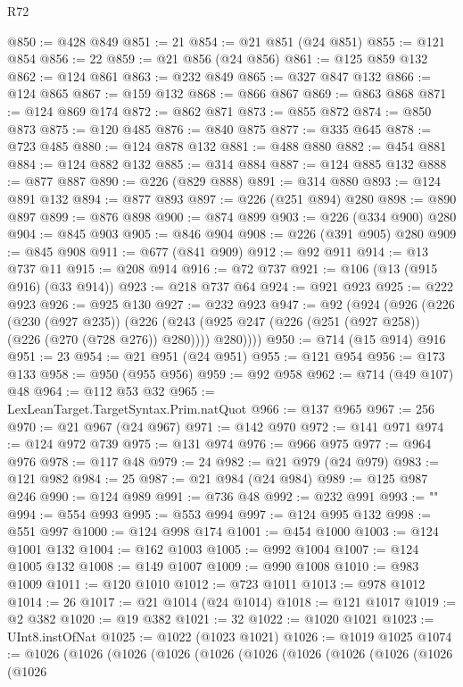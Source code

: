 \begin{lexlean}{R72}
\begin{coremodule}
@850 := @428 @849
@851 := 21
@854 := @21 @851 (@24 @851)
@855 := @121 @854
@856 := 22
@859 := @21 @856 (@24 @856)
@861 := @125 @859 @132
@862 := @124 @861
@863 := @232 @849
@865 := @327 @847 @132
@866 := @124 @865
@867 := @159 @132
@868 := @866 @867
@869 := @863 @868
@871 := @124 @869 @174
@872 := @862 @871
@873 := @855 @872
@874 := @850 @873
@875 := @120 @485
@876 := @840 @875
@877 := @335 @645
@878 := @723 @485
@880 := @124 @878 @132
@881 := @488 @880
@882 := @454 @881
@884 := @124 @882 @132
@885 := @314 @884
@887 := @124 @885 @132
@888 := @877 @887
@890 := @226 (@829 @888)
@891 := @314 @880
@893 := @124 @891 @132
@894 := @877 @893
@897 := @226 (@251 @894) @280
@898 := @890 @897
@899 := @876 @898
@900 := @874 @899
@903 := @226 (@334 @900) @280
@904 := @845 @903
@905 := @846 @904
@908 := @226 (@391 @905) @280
@909 := @845 @908
@911 := @677 (@841 @909)
@912 := @92 @911
@914 := @13 @737 @11
@915 := @208 @914
@916 := @72 @737
@921 := @106 (@13 (@915 @916) (@33 @914))
@923 := @218 @737 @64
@924 := @921 @923
@925 := @222 @923
@926 := @925 @130
@927 := @232 @923
@947 := @92
    (@924
      (@926
        (@226
          (@230 (@927 @235))
          (@226 (@243 (@925 @247 (@226 (@251 (@927 @258)) (@226 (@270 (@728 @276)) @280)))) @280))))
@950 := @714 (@15 @914) @916
@951 := 23
@954 := @21 @951 (@24 @951)
@955 := @121 @954
@956 := @173 @133
@958 := @950 (@955 @956)
@959 := @92 @958
@962 := @714 (@49 @107) @48
@964 := @112 @53 @32
@965 := LexLeanTarget.TargetSyntax.Prim.natQuot
@966 := @137 @965
@967 := 256
@970 := @21 @967 (@24 @967)
@971 := @142 @970
@972 := @141 @971
@974 := @124 @972 @739
@975 := @131 @974
@976 := @966 @975
@977 := @964 @976
@978 := @117 @48
@979 := 24
@982 := @21 @979 (@24 @979)
@983 := @121 @982
@984 := 25
@987 := @21 @984 (@24 @984)
@989 := @125 @987 @246
@990 := @124 @989
@991 := @736 @48
@992 := @232 @991
@993 := "\n"
@994 := @554 @993
@995 := @553 @994
@997 := @124 @995 @132
@998 := @551 @997
@1000 := @124 @998 @174
@1001 := @454 @1000
@1003 := @124 @1001 @132
@1004 := @162 @1003
@1005 := @992 @1004
@1007 := @124 @1005 @132
@1008 := @149 @1007
@1009 := @990 @1008
@1010 := @983 @1009
@1011 := @120 @1010
@1012 := @723 @1011
@1013 := @978 @1012
@1014 := 26
@1017 := @21 @1014 (@24 @1014)
@1018 := @121 @1017
@1019 := @2 @382
@1020 := @19 @382
@1021 := 32
@1022 := @1020 @1021
@1023 := UInt8.instOfNat
@1025 := @1022 (@1023 @1021)
@1026 := @1019 @1025
@1074 := @1026
    (@1026
      (@1026
        (@1026
          (@1026
            (@1026
              (@1026
                (@1026
                  (@1026
                    (@1026
                      (@1026

\end{coremodule}
\end{lexlean}
